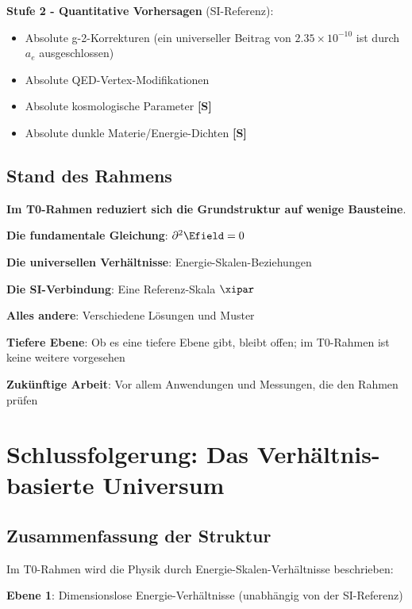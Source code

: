 	\textbf{Stufe 2 - Quantitative Vorhersagen} (SI-Referenz):
	\begin{itemize}
		\item Absolute g-2-Korrekturen (ein universeller Beitrag von $2.35\times10^{-10}$ ist durch $a_e$ ausgeschlossen)
		\item Absolute QED-Vertex-Modifikationen
		\item Absolute kosmologische Parameter \textbf{[S]}
		\item Absolute dunkle Materie/Energie-Dichten \textbf{[S]}
	\end{itemize}
	
	\subsection{Stand des Rahmens}
	
	\begin{tcolorbox}[colback=yellow!5!white,colframe=orange!75!black,title=Grundstruktur im T0-Rahmen]
		\textbf{Im T0-Rahmen reduziert sich die Grundstruktur auf wenige Bausteine}.
		
		\textbf{Die fundamentale Gleichung}: $\partial^2 \Efield = 0$
		
		\textbf{Die universellen Verhältnisse}: Energie-Skalen-Beziehungen
		
		\textbf{Die SI-Verbindung}: Eine Referenz-Skala $\xipar$
		
		\textbf{Alles andere}: Verschiedene Lösungen und Muster
		
		\textbf{Tiefere Ebene}: Ob es eine tiefere Ebene gibt, bleibt offen; im T0-Rahmen ist keine weitere vorgesehen
		
		\textbf{Zukünftige Arbeit}: Vor allem Anwendungen und Messungen, die den Rahmen prüfen
	\end{tcolorbox}
	
	\section{Schlussfolgerung: Das Verhältnis-basierte Universum}
	
	\subsection{Zusammenfassung der Struktur}
	
	Im T0-Rahmen wird die Physik durch Energie-Skalen-Verhältnisse beschrieben:
	
	\textbf{Ebene 1}: Dimensionslose Energie-Verhältnisse (unabhängig von der SI-Referenz)
	
